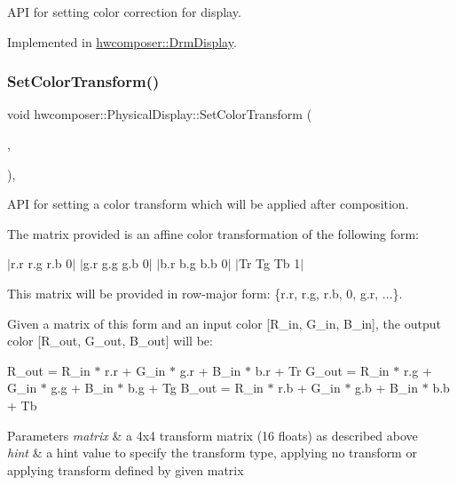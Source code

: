 A\+PI for setting color correction for display. 

Implemented in \mbox{\hyperlink{classhwcomposer_1_1DrmDisplay_a8da99b54fe8c1261f1bf9a3d00474133}{hwcomposer\+::\+Drm\+Display}}.

\mbox{\label{classhwcomposer_1_1PhysicalDisplay_aa6a598f275a6b67ba5c256ee0d830b59}} 
\subsubsection{\texorpdfstring{Set\+Color\+Transform()}{SetColorTransform()}}
{\footnotesize\ttfamily void hwcomposer\+::\+Physical\+Display\+::\+Set\+Color\+Transform (\begin{DoxyParamCaption}\item[{const float $\ast$}]{,  }\item[{\mbox{\hyperlink{hwcdefs_8h_a1a2c55aec4fbd12a1e323f2bdb3e9b88}{H\+W\+C\+Color\+Transform}}}]{ }\end{DoxyParamCaption})\hspace{0.3cm}{\ttfamily [override]}, {\ttfamily [virtual]}}

A\+PI for setting a color transform which will be applied after composition.

The matrix provided is an affine color transformation of the following form\+:

$\vert$r.r r.\+g r.\+b 0$\vert$ $\vert$g.r g.\+g g.\+b 0$\vert$ $\vert$b.r b.\+g b.\+b 0$\vert$ $\vert$\+Tr Tg Tb 1$\vert$

This matrix will be provided in row-\/major form\+: \{r.\+r, r.\+g, r.\+b, 0, g.\+r, ...\}.

Given a matrix of this form and an input color \mbox{[}R\+\_\+in, G\+\_\+in, B\+\_\+in\mbox{]}, the output color \mbox{[}R\+\_\+out, G\+\_\+out, B\+\_\+out\mbox{]} will be\+:

R\+\_\+out = R\+\_\+in $\ast$ r.\+r + G\+\_\+in $\ast$ g.\+r + B\+\_\+in $\ast$ b.\+r + Tr G\+\_\+out = R\+\_\+in $\ast$ r.\+g + G\+\_\+in $\ast$ g.\+g + B\+\_\+in $\ast$ b.\+g + Tg B\+\_\+out = R\+\_\+in $\ast$ r.\+b + G\+\_\+in $\ast$ g.\+b + B\+\_\+in $\ast$ b.\+b + Tb


\begin{DoxyParams}{Parameters}
{\em matrix} & a 4x4 transform matrix (16 floats) as described above \\
\hline
{\em hint} & a hint value to specify the transform type, applying no transform or applying transform defined by given matrix \\
\hline
\end{DoxyParams}


